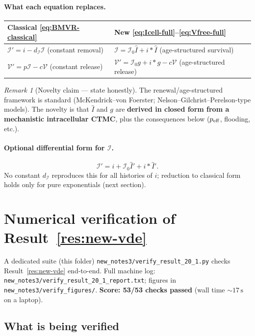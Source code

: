 \documentclass[11pt,a4paper]{article}
\newcommand{\Ihat}{\widehat{I}}
\newcommand{\Icell}{\mathcal{I}}
\newcommand{\Vfree}{\mathcal{V}}
\theoremstyle{plain}
\theoremstyle{definition}
\theoremstyle{remark}
\newtheorem{remark}[result]{Remark}
\begin{document}
\paragraph{What each equation replaces.}
\begin{center}
\renewcommand{\arraystretch}{1.3}
\begin{tabular}{@{}p{}p{}@{}}
\toprule
Classical \eqref{eq:BMVR-classical} & New \eqref{eq:Icell-full}--\eqref{eq:Vfree-full} \\
\midrule
$\Icell'=i-d_{\Icell}\Icell$ (constant removal)
& $\Icell=\Icell_0\Ihat+i*\Ihat$ (age-structured survival) \\[0.5em]
$\Vfree'=p\Icell-c\Vfree$ (constant release)
& $\Vfree'=\Icell_0 g+i*g-c\Vfree$ (age-structured release) \\
\bottomrule
\end{tabular}
\end{center}

\begin{remark}[Novelty claim --- state honestly]
The renewal/age-structured framework is standard (McKendrick--von Foerster;
Nelson--Gilchrist--Perelson-type models). The novelty is that $\Ihat$ and $g$
are \textbf{derived in closed form from a mechanistic intracellular CTMC}, plus
the consequences below ($p_{\rm eff}$, flooding, etc.).
\end{remark}

\paragraph{Optional differential form for $\Icell$.}
\[
\Icell'
=i+\Icell_0\Ihat'+i*\Ihat'.
\]
No constant $d_{\Icell}$ reproduces this for all histories of $i$; reduction to
classical form holds only for pure exponentials (next section).

\section{Numerical verification of Result~\ref{res:new-vde}}
\label{sec:verify-20-1}

A dedicated suite (this folder)
\texttt{new\_notes3/verify\_result\_20\_1.py} checks
Result~\ref{res:new-vde} end-to-end. Full machine log:
\texttt{new\_notes3/verify\_result\_20\_1\_report.txt}; figures in
\texttt{new\_notes3/verify\_figures/}. \textbf{Score: 53/53 checks passed}
(wall time $\sim 17\,\mathrm{s}$ on a laptop).

\subsection{What is being verified}
\end{document}
